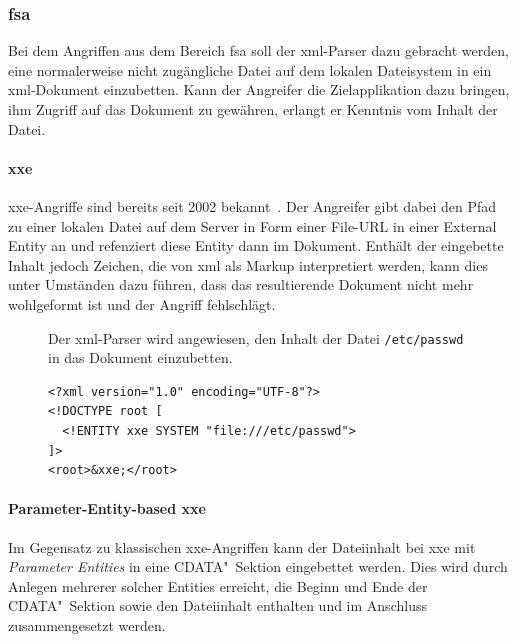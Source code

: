 \subsubsection{\acrlong{fsa}}
\label{sec:xmlattacks-fsa}
Bei dem Angriffen aus dem Bereich \acrlong{fsa} soll der \acrshort{xml}-Parser dazu gebracht werden, eine normalerweise nicht zugängliche Datei auf dem lokalen Dateisystem in ein \acrshort{xml}-Dokument einzubetten. Kann der Angreifer die Zielapplikation dazu bringen, ihm Zugriff auf das Dokument zu gewähren, erlangt er Kenntnis vom Inhalt der Datei.

\paragraph{\acrfull{xxe}}
\acrshort{xxe}-Angriffe sind bereits seit 2002 bekannt~\cite{steuck2002xxe}. Der Angreifer gibt dabei den Pfad zu einer lokalen Datei auf dem Server in Form einer File-URL in einer External Entity an und refenziert diese Entity dann im Dokument. Enthält der eingebette Inhalt jedoch Zeichen, die von \acrshort{xml} als Markup interpretiert werden, kann dies unter Umständen dazu führen, dass das resultierende Dokument nicht mehr wohlgeformt ist und der Angriff fehlschlägt.~\cite[Abschnitt 5.1]{spaeth2016sok}

\begin{figure}[h!]
\begin{example} Der \acrshort{xml}-Parser wird angewiesen, den Inhalt der Datei \texttt{/etc/passwd} in das Dokument einzubetten.
    \begin{verbatim}
<?xml version="1.0" encoding="UTF-8"?>
<!DOCTYPE root [
  <!ENTITY xxe SYSTEM "file:///etc/passwd">
]>
<root>&xxe;</root>
    \end{verbatim}
\end{example}
\end{figure}

\paragraph{Parameter-Entity-based \acrfull{xxe}} Im Gegensatz zu klassischen \acrshort{xxe}-Angriffen kann der Dateiinhalt bei \gls{xxe} mit \emph{Parameter Entities} in eine CDATA"~Sektion eingebettet werden. Dies wird durch Anlegen mehrerer solcher Entities erreicht, die Beginn und Ende der CDATA"~Sektion sowie den Dateiinhalt enthalten und im Anschluss zusammengesetzt werden.~\cite[S.~10]{morgan2014xml}


